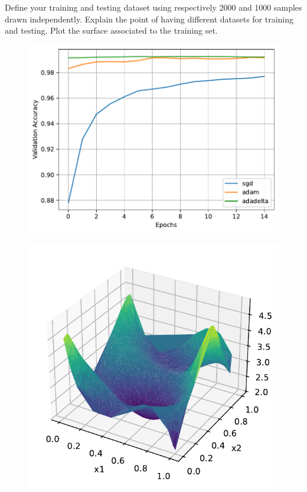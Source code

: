 \documentclass{article}
\newenvironment{task}[1]{
  \begin{tcolorbox}[
    colback=highlight!5!white,
    colframe=highlight,
    title={Task #1}
  ]
}{
  \end{tcolorbox}
}
\begin{document}
\begin{task}{1.4.1}
  Define your training and testing dataset using respectively 2000 and 1000 samples drawn
  independently. Explain the point of having different datasets for training and testing. Plot the
  surface associated to the training set.
\end{task}

\begin{figure}[ht!]
  \centering
  \begin{minipage}{0.48\textwidth}
    \centering
    \includegraphics[width=0.9\linewidth]{ex1_mnist_optimizers.pdf}
    \label{fig:ex1_mnist_optimizers}
  \end{minipage}%
  \begin{minipage}{0.48\textwidth}
    \centering
    \includegraphics[width=0.9\linewidth]{ex1_regression_train.pdf}
    \label{fig:ex1_regression_train}
  \end{minipage}
\end{figure}
\end{document}
